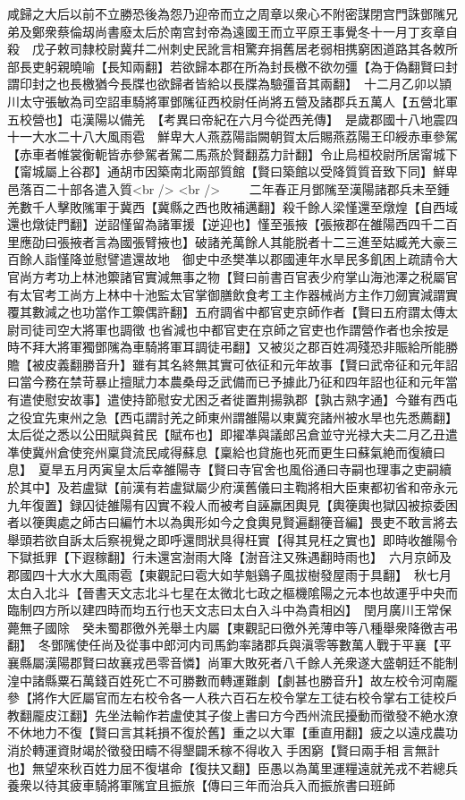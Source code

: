 咸歸之大后以前不立勝恐後為怨乃迎帝而立之周章以衆心不附密謀閉宫門誅鄧隲兄弟及鄭衆蔡倫刼尚書廢太后於南宫封帝為遠國王而立平原王事覺冬十一月丁亥章自殺　戊子敕司隸校尉冀幷二州刺史民訛言相驚弃捐舊居老弱相携窮困道路其各敇所部長吏躬親曉喻【長知兩翻】若欲歸本郡在所為封長檄不欲勿彊【為于偽翻賢曰封謂印封之也長檄猶今長牒也欲歸者皆給以長牒為驗彊音其兩翻】　十二月乙卯以頴川太守張敏為司空詔車騎將軍鄧隲征西校尉任尚將五營及諸郡兵五萬人【五營北軍五校營也】屯漢陽以備羌　【考異曰帝紀在六月今從西羌傳】　是歲郡國十八地震四十一大水二十八大風雨雹　鮮卑大人燕荔陽詣闕朝賀太后賜燕荔陽王印綬赤車參駕【赤車者帷裳衡軛皆赤參駕者駕二馬燕於賢翻荔力計翻】令止烏桓校尉所居甯城下【甯城屬上谷郡】通胡市因築南北兩部質館【賢曰築館以受降質質音致下同】鮮卑邑落百二十部各遣入質<br />
<br />
　　二年春正月鄧隲至漢陽諸郡兵未至鍾羌數千人擊敗隲軍于冀西【冀縣之西也敗補邁翻】殺千餘人梁慬還至燉煌【自西域還也燉徒門翻】逆詔慬留為諸軍援【逆迎也】慬至張掖【張掖郡在雒陽西四千二百里應劭曰張掖者言為國張臂掖也】破諸羌萬餘人其能脱者十二三進至姑臧羌大豪三百餘人詣慬降並慰譬遣還故地　御史中丞樊凖以郡國連年水旱民多飢困上疏請令大官尚方考功上林池籞諸官實減無事之物【賢曰前書百官表少府掌山海池澤之税屬官有太官考工尚方上林中十池監太官掌御膳飲食考工主作器械尚方主作刀劒實減謂實覆其數減之也功當作工籞偶許翻】五府調省中都官吏京師作者【賢曰五府謂太傳太尉司徒司空大將軍也調徵也省減也中都官吏在京師之官吏也作謂營作者也余按是時不拜大將軍獨鄧隲為車騎將軍耳調徒弔翻】又被災之郡百姓凋殘恐非賑給所能勝贍【被皮義翻勝音升】雖有其名終無其實可依征和元年故事【賢曰武帝征和元年詔曰當今務在禁苛暴止擅賦力本農桑母乏武備而已予據此乃征和四年詔也征和元年當有遣使慰安故事】遣使持節慰安尤困乏者徙置荆揚孰郡【孰古熟字通】今雖有西屯之役宜先東州之急【西屯謂討羌之師東州謂雒陽以東冀兖諸州被水旱也先悉薦翻】太后從之悉以公田賦與貧民【賦布也】即擢凖與議郎呂倉並守光禄大夫二月乙丑遣凖使冀州倉使兖州稟貸流民咸得蘇息【稟給也貸施也死而更生曰蘇氣絶而復續曰息】　夏旱五月丙寅皇太后幸雒陽寺【賢曰寺官舍也風俗通曰寺嗣也理事之吏嗣續於其中】及若盧獄【前漢有若盧獄屬少府漢舊儀曰主鞫將相大臣東都初省和帝永元九年復置】録囚徒雒陽有囚實不殺人而被考自誣羸困輿見【輿箯輿也獄囚被掠委困者以箯輿處之師古曰編竹木以為輿形如今之食輿見賢遍翻箯音編】畏吏不敢言將去舉頭若欲自訴太后察視覺之即呼還問狀具得枉實【得其見枉之實也】即時收雒陽令下獄抵罪【下遐稼翻】行未還宮澍雨大降【澍音注又殊遇翻時雨也】　六月京師及郡國四十大水大風雨雹【東觀記曰雹大如芋魁鷄子風拔樹發屋雨于具翻】　秋七月太白入北斗【晉書天文志北斗七星在太微北七政之樞機隂陽之元本也故運乎中央而臨制四方所以建四時而均五行也天文志曰太白入斗中為貴相凶】　閏月廣川王常保薨無子國除　癸未蜀郡徼外羌舉土内屬【東觀記曰徼外羌薄申等八種舉衆降徼吉弔翻】　冬鄧隲使任尚及從事中郎河内司馬鈞率諸郡兵與滇零等數萬人戰于平襄【平襄縣屬漢陽郡賢曰故襄戎邑零音憐】尚軍大敗死者八千餘人羌衆遂大盛朝廷不能制湟中諸縣粟石萬錢百姓死亡不可勝數而轉運難劇【劇甚也勝音升】故左校令河南龎參【將作大匠屬官而左右校令各一人秩六百石左校令掌左工徒右校令掌右工徒校戶教翻龎皮江翻】先坐法輸作若盧使其子俊上書曰方今西州流民擾動而徵發不絶水潦不休地力不復【賢曰言其耗損不復於舊】重之以大軍【重直用翻】疲之以遠戍農功消於轉運資財竭於徵發田疇不得墾闢禾稼不得收入手困窮【賢曰兩手相言無計也】無望來秋百姓力屈不復堪命【復扶又翻】臣愚以為萬里運糧遠就羌戎不若總兵養衆以待其疲車騎將軍隲宜且振旅【傳曰三年而治兵入而振旅書曰班師